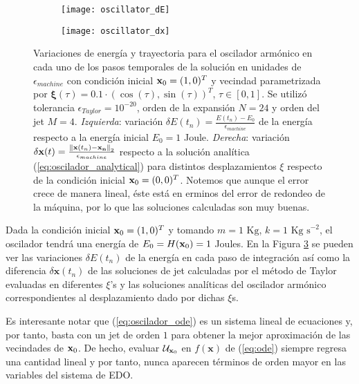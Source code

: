  \begin{figure}[h!]
\centering
\begin{subfigure}{0.49\textwidth}
	\centering
	\texttt{[image: oscillator\_dE]}
	\label{fig:oscillator_dE}
\end{subfigure}
%
\begin{subfigure}{0.49\textwidth}
	\centering
	\texttt{[image: oscillator\_dx]}
	\label{fig:oscillator_dx}
\end{subfigure}
\caption{Variaciones de energía y trayectoria para el oscilador armónico en cada uno de los pasos temporales de la solución en unidades de $\epsilon_{machine}$ con condición inicial $\mathbf{x}_0 = (1,0)^T$ y vecindad parametrizada por  $\mathbf{\xi}(\tau) = 0.1\cdot \left( \cos(\tau), \sin(\tau) \right)^T$, $\tau \in [0,1]$. Se utilizó tolerancia $\epsilon_{Taylor} = 10^{-20}$, orden de la expansión $N = 24$ y orden del jet $M=4$. \textit{Izquierda}: variación $\delta E(t_n) = \frac{E(t_n)-E_0}{\epsilon_{machine}}$ de la energía respecto a la energía inicial $E_0 = 1$ Joule. \textit{Derecha}: variación $\delta \mathbf{x}(t) =  \frac{\left\lVert\mathbf{x}(t_n) - \mathbf{x_n}\right\rVert_2}{\epsilon_{machine}}$ respecto a la solución analítica (\ref{eq:oscilador_analytical}) para distintos desplazamientos $\xi$ respecto de la condición inicial $\mathbf{x}_0 = (0,0)^T$. Notemos que aunque el error crece de manera lineal, éste está en erminos del error de redondeo de la máquina, por lo que las soluciones calculadas son muy buenas.}
\label{fig:oscillator_deltas}
\end{figure}

Dada la condición inicial $\mathbf{x}_0 = (1,0)^T$ y tomando $m = 1 \textrm{ Kg}$, $k = 1 \textrm{ Kg s}^{-2}$, el oscilador tendrá una energía de $E_0 = H(\mathbf{x}_0) = 1$ Joules. En la Figura \ref{fig:oscillator_deltas} se pueden ver las variaciones $\delta E(t_n)$ de la energía en cada paso de integración así como la diferencia $\delta \mathbf{x}(t_n)$ de las soluciones de jet calculadas por el método de Taylor evaluadas en diferentes $\xi$'s y las soluciones analíticas del oscilador armónico correspondientes al desplazamiento dado por dichas $\xi$s.

Es interesante notar que (\ref{eq:oscilador_ode}) es un sistema lineal de ecuaciones y, por tanto, basta con un jet de orden $1$ para obtener la mejor aproximación de las vecindades de $\mathbf{x}_0$. De hecho, evaluar $\mathcal{U}_{\mathbf{x}_0}$ en $f(\mathbf{x})$ de (\ref{eq:ode}) siempre regresa una cantidad lineal y por tanto, nunca aparecen términos de orden mayor en las variables del sistema de EDO.

